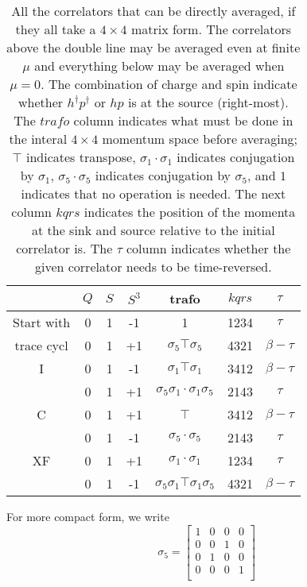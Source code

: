 \begin{table}[h]
  \centering
  \begin{tabular}{c|cccccc}
             & $Q$ & $S$ & $S^3$ & trafo & $kqrs$    & $\tau$  \\
  \hline
  Start with & 0 & 1 & -1 & 1 & 1234 &  $\tau$  \\
  \hline
  trace cycl & 0 & 1 & +1 & $\sigma_5 \top \sigma_5$ & 4321 & $\beta-\tau$ \\
  \hline
  I          & 0 & 1 & -1 & $\sigma_1 \top \sigma_1$ & 3412 & $\beta-\tau$ \\
             & 0 & 1 & +1 & $\sigma_5\sigma_1\cdot\sigma_1\sigma_5$ & 2143 & $\tau$ \\
  \hline\hline
  C          & 0 & 1 & +1 & $\top$ & 3412 & $\beta-\tau$ \\
             & 0 & 1 & -1 & $\sigma_5\cdot\sigma_5$ & 2143 & $\tau$ \\
  \hline
  XF         & 0 & 1 & +1 & $\sigma_1\cdot\sigma_1$ & 1234 & $\tau$ \\
             & 0 & 1 & -1 & $\sigma_5\sigma_1\top\sigma_1\sigma_5$ & 4321 & $\beta-\tau$
  \end{tabular}
  \caption{All the correlators that can be directly averaged, if they all take a $4 \times 4$ matrix form. The correlators above the double line may be averaged even at finite $\mu$ and everything below may be averaged when $\mu = 0$. The combination of charge and spin indicate whether $h^\dagger p^\dagger$ or $hp$ is at the source (right-most). The $trafo$ column indicates what must be done in the interal $4 \times 4$ momentum space before averaging; $\top$ indicates transpose, $\sigma_1\cdot\sigma_1$ indicates conjugation by $\sigma_1$, $\sigma_5\cdot\sigma_5$ indicates conjugation by $\sigma_5$, and $1$ indicates that no operation is needed. The next column $kqrs$ indicates the position of the momenta at the sink and source relative to the initial correlator is. The $\tau$ column indicates whether the given correlator needs to be time-reversed.}
  \label{tab:phhp}
\end{table}

For more compact form, we write
\\
\begin{equation}
 \sigma_5 = \left[ {\begin{array}{cccc}
    1 & 0 & 0 & 0 \\
    0 & 0 & 1 & 0 \\
    0 & 1 & 0 & 0 \\
    0 & 0 & 0 & 1 \\
  \end{array} } \right]
\end{equation}


